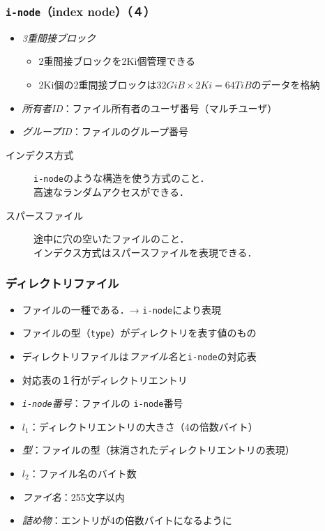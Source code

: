 \documentclass[unicode,handout]{beamer}                   %
\newcommand{\inode}{\texttt{i-node}}
\begin{document}
\begin{frame}
  \frametitle{\inode （index node）（４）}
  \begin{itemize}
  \item \emph{3重間接ブロック}\\
    \begin{itemize}
    \item 2重間接ブロックを2Ki個管理できる
    \item 2Ki個の2重間接ブロックは$32GiB \times 2Ki = 64TiB$のデータを格納
    \end{itemize}
  \item \emph{所有者ID}：ファイル所有者のユーザ番号（マルチユーザ）
  \item \emph{グループID}：ファイルのグループ番号
  \end{itemize}
  \vfill
  \begin{description}
  \item[インデクス方式]
    \inode のような構造を使う方式のこと．\\
    高速なランダムアクセスができる．
  \item[スパースファイル]
    途中に穴の空いたファイルのこと．\\
    インデクス方式はスパースファイルを表現できる．
  \end{description}
\end{frame}

\begin{frame}
  \frametitle{ディレクトリファイル}
  \begin{itemize}
  \item ファイルの一種である．→ \inode により表現
  \item ファイルの型（\texttt{type}）がディレクトリを表す値のもの
  \item ディレクトリファイルは\emph{ファイル名}と\inode の対応表
  \item 対応表の１行がディレクトリエントリ
  \end{itemize}
  \begin{itemize}
  \item \emph{\inode 番号}：ファイルの \inode 番号
  \item \emph{$l_1$}：ディレクトリエントリの大きさ（4の倍数バイト）
  \item \emph{型}：ファイルの型（抹消されたディレクトリエントリの表現）
  \item \emph{$l_2$}：ファイル名のバイト数
  \item \emph{ファイ名}：255文字以内
  \item \emph{詰め物}：エントリが4の倍数バイトになるように
  \end{itemize}
\end{frame}
\end{document}
